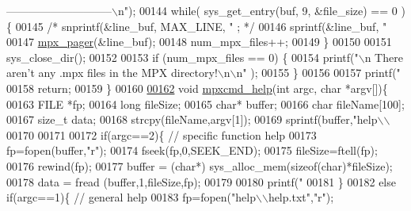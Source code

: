 \begin{DoxyCode}
{{{{{{      -----------------------------\(\backslash\)n"});
00144         \textcolor{keywordflow}{while}( sys\_get\_entry(buf, 9, &file\_size) == 0 )\{
00145                 \textcolor{comment}{/* snprintf(&line\_buf, MAX\_LINE, "    %
      ; */}
00146                 sprintf(&line\_buf, \textcolor{stringliteral}{"    %
00147                 \hyperlink{mpx__util_8c_a9e59881f10bd91d7255f18f205e101e6}{mpx_pager}(&line\_buf);
00148                 num\_mpx\_files++;
00149         \}
00150 
00151         sys\_close\_dir();
00152 
00153         \textcolor{keywordflow}{if} (num\_mpx\_files == 0) \{
00154                 printf(\textcolor{stringliteral}{"\(\backslash\)n There aren't any .mpx files in the MPX directory!\(\backslash\)n\(\backslash\)n"
      });
00155         \}
00156 
00157         printf(\textcolor{stringliteral}{"%
00158         \textcolor{keywordflow}{return};
00159 \}
00160 
\hypertarget{mpx__cmd_8c_source_l00162}{}\hyperlink{mpx__cmd_8h_ae9b1349cfcfc34815e87cae5330660e8}{00162} \textcolor{keywordtype}{void} \hyperlink{mpx__cmd_8c_ae9b1349cfcfc34815e87cae5330660e8}{mpxcmd_help}(\textcolor{keywordtype}{int} argc, \textcolor{keywordtype}{char} *argv[])\{
00163         FILE *fp;
00164         \textcolor{keywordtype}{long} fileSize;
00165         \textcolor{keywordtype}{char}* buffer;
00166         \textcolor{keywordtype}{char} fileName[100];
00167         \textcolor{keywordtype}{size\_t} data;    
00168         strcpy(fileName,argv[1]);
00169         sprintf(buffer,\textcolor{stringliteral}{"help\(\backslash\)\(\backslash\)%
00170 
00171         
00172         \textcolor{keywordflow}{if}(argc==2)\{ \textcolor{comment}{// specific function help}
00173                 fp=fopen(buffer,\textcolor{stringliteral}{"r"});
00174                 fseek(fp,0,SEEK\_END);
00175                 fileSize=ftell(fp);
00176                 rewind(fp);
00177                 buffer = (\textcolor{keywordtype}{char}*) sys\_alloc\_mem(\textcolor{keyword}{sizeof}(\textcolor{keywordtype}{char})*fileSize);
00178                 data = fread (buffer,1,fileSize,fp);
00179                 
00180                 printf(\textcolor{stringliteral}{"%
00181         \}
00182         \textcolor{keywordflow}{else} \textcolor{keywordflow}{if}(argc==1)\{ \textcolor{comment}{// general help}
00183                 fp=fopen(\textcolor{stringliteral}{"help\(\backslash\)\(\backslash\)help.txt"},\textcolor{stringliteral}{"r"}); 
}}}}}}}}}
\end{DoxyCode}
